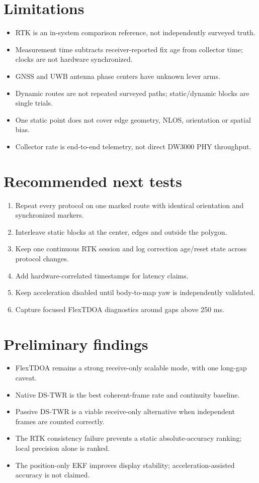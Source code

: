 \documentclass[10pt,a4paper]{article}
\begin{document}
\section{Limitations}
\begin{itemize}
\item RTK is an in-system comparison reference, not independently surveyed truth.
\item Measurement time subtracts receiver-reported fix age from collector time; clocks are not hardware synchronized.
\item GNSS and UWB antenna phase centers have unknown lever arms.
\item Dynamic routes are not repeated surveyed paths; static/dynamic blocks are single trials.
\item One static point does not cover edge geometry, NLOS, orientation or spatial bias.
\item Collector rate is end-to-end telemetry, not direct DW3000 PHY throughput.
\end{itemize}

\section{Recommended next tests}
\begin{enumerate}
\item Repeat every protocol on one marked route with identical orientation and synchronized markers.
\item Interleave static blocks at the center, edges and outside the polygon.
\item Keep one continuous RTK session and log correction age/reset state across protocol changes.
\item Add hardware-correlated timestamps for latency claims.
\item Keep acceleration disabled until body-to-map yaw is independently validated.
\item Capture focused FlexTDOA diagnostics around gaps above 250 ms.
\end{enumerate}

\section{Preliminary findings}
\begin{itemize}
\item FlexTDOA remains a strong receive-only scalable mode, with one long-gap caveat.
\item Native DS-TWR is the best coherent-frame rate and continuity baseline.
\item Passive DS-TWR is a viable receive-only alternative when independent frames are counted correctly.
\item The RTK consistency failure prevents a static absolute-accuracy ranking; local precision alone is ranked.
\item The position-only EKF improves display stability; acceleration-assisted accuracy is not claimed.
\end{itemize}
\end{document}
